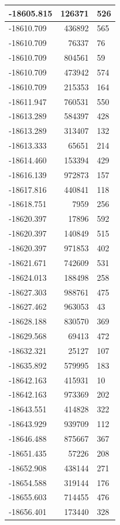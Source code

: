 \documentclass[]{book}
\theoremstyle{definition}
\theoremstyle{definition}
\theoremstyle{definition}
\theoremstyle{remark}
\begin{document}
\begin{tabular}{l|r|l}
\hline
-18605.815 & 126371 & 526\\
\hline
-18610.709 & 436892 & 565\\
\hline
-18610.709 & 76337 & 76\\
\hline
-18610.709 & 804561 & 59\\
\hline
-18610.709 & 473942 & 574\\
\hline
-18610.709 & 215353 & 164\\
\hline
-18611.947 & 760531 & 550\\
\hline
-18613.289 & 584397 & 428\\
\hline
-18613.289 & 313407 & 132\\
\hline
-18613.333 & 65651 & 214\\
\hline
-18614.460 & 153394 & 429\\
\hline
-18616.139 & 972873 & 157\\
\hline
-18617.816 & 440841 & 118\\
\hline
-18618.751 & 7959 & 256\\
\hline
-18620.397 & 17896 & 592\\
\hline
-18620.397 & 140849 & 515\\
\hline
-18620.397 & 971853 & 402\\
\hline
-18621.671 & 742609 & 531\\
\hline
-18624.013 & 188498 & 258\\
\hline
-18627.303 & 988761 & 475\\
\hline
-18627.462 & 963053 & 43\\
\hline
-18628.188 & 830570 & 369\\
\hline
-18629.568 & 69413 & 472\\
\hline
-18632.321 & 25127 & 107\\
\hline
-18635.892 & 579995 & 183\\
\hline
-18642.163 & 415931 & 10\\
\hline
-18642.163 & 973369 & 202\\
\hline
-18643.551 & 414828 & 322\\
\hline
-18643.929 & 939709 & 112\\
\hline
-18646.488 & 875667 & 367\\
\hline
-18651.435 & 57226 & 208\\
\hline
-18652.908 & 438144 & 271\\
\hline
-18654.588 & 319144 & 176\\
\hline
-18655.603 & 714455 & 476\\
\hline
-18656.401 & 173440 & 328\\

\end{tabular}
\end{document}
